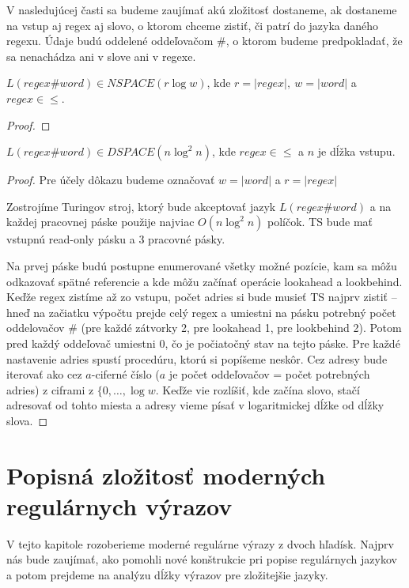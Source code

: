 V nasledujúcej časti sa budeme zaujímať akú zložitosť dostaneme, ak dostaneme na vstup aj regex aj slovo, o ktorom chceme zistiť, či patrí do jazyka daného regexu. Údaje budú oddelené oddeľovačom \#, o ktorom budeme predpokladať, že sa nenachádza ani v slove ani v regexe.

\begin{veta}
$L(regex\#word) \in NSPACE(r \log w)$, kde $r = |regex|,~w = |word|$ a $regex \in \le$.
\end{veta}
\begin{proof}
\TODO
\end{proof}

\begin{veta}
$L(regex\#word) \in DSPACE(n \log^2 n)$, kde $regex \in \le$ a $n$ je dĺžka vstupu.
\end{veta}
\begin{proof}
\TODO

Pre účely dôkazu budeme označovať $w = |word|$ a $r = |regex|$

Zostrojíme Turingov stroj, ktorý bude akceptovať jazyk $L(regex\#word)$ a na každej pracovnej páske použije najviac $O(n\log^2 n)$ políčok. TS bude mať vstupnú read-only pásku a 3 pracovné pásky.

Na prvej páske budú postupne enumerované všetky možné pozície, kam sa môžu odkazovať spätné referencie a kde môžu začínať operácie lookahead a lookbehind. Keďže regex zistíme až zo vstupu, počet adries si bude musieť TS najprv zistiť -- hneď na začiatku výpočtu prejde celý regex a umiestni na pásku potrebný počet oddelovačov \# (pre každé zátvorky 2, pre lookahead 1, pre lookbehind 2). Potom pred každý oddeľovač umiestni 0, čo je počiatočný stav na tejto páske. Pre každé nastavenie adries spustí procedúru, ktorú si popíšeme neskôr. Cez adresy bude iterovať ako cez $a$-ciferné číslo ($a$ je počet oddeľovačov = počet potrebných adries) z ciframi z $\lbrace 0,\dots, \log w$. Keďže vie rozlíšiť, kde začína slovo, stačí adresovať od tohto miesta a adresy vieme písať v logaritmickej dĺžke od dĺžky slova.
\end{proof}


\section[Popisná zložitosť]{Popisná zložitosť moderných regulárnych výrazov}
\label{vzlozitost}

V tejto kapitole rozoberieme moderné regulárne výrazy z dvoch hľadísk. Najprv nás bude zaujímať, ako pomohli nové konštrukcie pri popise regulárnych jazykov a potom prejdeme na analýzu dĺžky výrazov pre zložitejšie jazyky.

